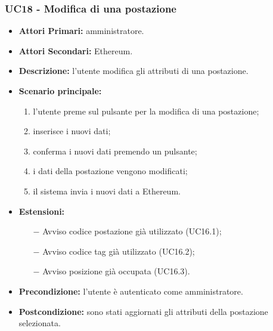 \subsubsection{ UC18 - Modifica di una postazione}
\begin{itemize}
	\item\textbf{Attori Primari:}
	amministratore.
	\item\textbf{Attori Secondari:}
	Ethereum.
	\item\textbf{Descrizione:}
	l'utente modifica gli attributi di una postazione.
	\item\textbf{Scenario principale:} 
	\begin{enumerate}
		\item l'utente preme sul pulsante per la modifica di una postazione;
		\item inserisce i nuovi dati;
		\item conferma i nuovi dati premendo un pulsante;
		\item i dati della postazione vengono modificati;
		\item il sistema invia i nuovi dati a Ethereum.
	\end{enumerate}
	\item\textbf{Estensioni:}
	\begin{itemize}
		\item[$-$] Avviso codice postazione già utilizzato (UC16.1);
		\item[$-$] Avviso codice tag già utilizzato (UC16.2);
		\item[$-$] Avviso posizione già occupata (UC16.3).
	\end{itemize}
	\item\textbf{Precondizione:} 
	l'utente è autenticato come amministratore.
	\item\textbf{Postcondizione:}
	sono stati aggiornati gli attributi della postazione selezionata.
\end{itemize}


